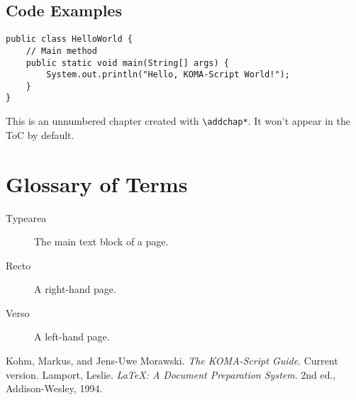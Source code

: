\documentclass[
    a4paper,
    11pt,
    DIV=12,
    BCOR=10mm,          %
    twoside,
    headings=normal,
    open=right,         %
    toc=bibliography,
    toc=listof,
    listof=totoc,
    parskip=false,      %
    captions=tableheading,
    numbers=autoendperiod,
    appendixprefix=true,
    chapterprefix=true
]{scrbook}
\begin{document}
\section{Code Examples}
\begin{lstlisting}[caption={A Java Snippet}, label={lst:java}]
public class HelloWorld {
    // Main method
    public static void main(String[] args) {
        System.out.println("Hello, KOMA-Script World!");
    }
}
\end{lstlisting}
\lipsum[12]

This is an unnumbered chapter created with \verb|\addchap*|. It won't appear in the ToC by default.
\lipsum[13-14]


\appendix
\chapter{Glossary of Terms}
\lipsum[15-16]
\begin{description}
  \item[Typearea] The main text block of a page.
  \item[Recto] A right-hand page.
  \item[Verso] A left-hand page.
\end{description}

\backmatter %

\begin{thebibliography}{9}
   Kohm, Markus, and Jens-Uwe Morawski. \textit{The KOMA-Script Guide}. Current version.
   Lamport, Leslie. \textit{LaTeX: A Document Preparation System}. 2nd ed., Addison-Wesley, 1994.
\end{thebibliography}

\printindex
\end{document}
